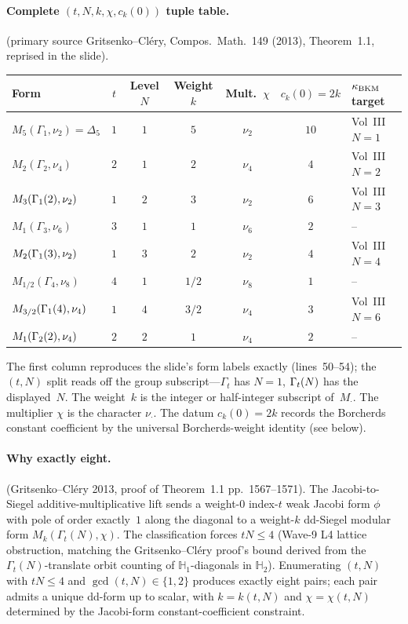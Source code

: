\paragraph{Complete $(t, N, k, \chi, c_k(0))$ tuple table.}
\ClaimStatusTheorem{} (primary source Gritsenko--Cl\'ery, Compos.\ Math.\
149 (2013), Theorem~1.1, reprised in the slide).
\begin{center}
\small
\begin{tabular}{lcccccl}
\hline
Form & $t$ & Level $N$ & Weight $k$ & Mult.\ $\chi$ & $c_k(0) = 2k$ & $\kappa_{\mathrm{BKM}}$ target \\
\hline
$M_5(\Gamma_1,\nu_2) = \Delta_5$      & $1$ & $1$ & $5$   & $\nu_2$ & $10$ & Vol~III $N{=}1$ \\
$M_2(\Gamma_2,\nu_4)$                 & $2$ & $1$ & $2$   & $\nu_4$ & $4$  & Vol~III $N{=}2$ \\
$M_3(\Gamma_{1}(2),\nu_2)$            & $1$ & $2$ & $3$   & $\nu_2$ & $6$  & Vol~III $N{=}3$ \\
$M_1(\Gamma_3,\nu_6)$                 & $3$ & $1$ & $1$   & $\nu_6$ & $2$  & -- \\
$M_2(\Gamma_{1}(3),\nu_2)$            & $1$ & $3$ & $2$   & $\nu_2$ & $4$  & Vol~III $N{=}4$ \\
$M_{1/2}(\Gamma_4,\nu_8)$             & $4$ & $1$ & $1/2$ & $\nu_8$ & $1$  & -- \\
$M_{3/2}(\Gamma_{1}(4),\nu_4)$        & $1$ & $4$ & $3/2$ & $\nu_4$ & $3$  & Vol~III $N{=}6$ \\
$M_1(\Gamma_{2}(2),\nu_4)$            & $2$ & $2$ & $1$   & $\nu_4$ & $2$  & -- \\
\hline
\end{tabular}
\end{center}

The first column reproduces the slide's form labels exactly (lines~50--54);
the $(t, N)$ split reads off the group subscript---$\Gamma_t$ has $N=1$,
$\Gamma_{t}(N)$ has the displayed~$N$. The weight~$k$ is the integer or
half-integer subscript of~$M_{\cdot}$. The multiplier $\chi$ is the
character $\nu_{\cdot}$. The datum $c_k(0) = 2k$ records the Borcherds
constant coefficient by the universal Borcherds-weight identity (see
below).

\paragraph{Why exactly eight.}
\ClaimStatusTheorem{} (Gritsenko--Cl\'ery 2013, proof of Theorem~1.1
pp.~1567--1571). The Jacobi-to-Siegel additive-multiplicative lift sends
a weight-$0$ index-$t$ weak Jacobi form $\phi$ with pole of order
exactly~$1$ along the diagonal to a weight-$k$ dd-Siegel modular form
$M_k(\Gamma_t(N), \chi)$. The classification forces
$tN \leq 4$ (Wave-9 L4 lattice obstruction, matching the Gritsenko--Cl\'ery
proof's bound derived from the $\Gamma_t(N)$-translate orbit counting
of $\mathbb{H}_1$-diagonals in $\mathbb{H}_2$). Enumerating
$(t, N)$ with $tN \leq 4$ and $\gcd(t, N) \in \{1, 2\}$ produces exactly
eight pairs; each pair admits a unique dd-form up to scalar, with
$k = k(t, N)$ and $\chi = \chi(t, N)$ determined by the Jacobi-form
constant-coefficient constraint.

